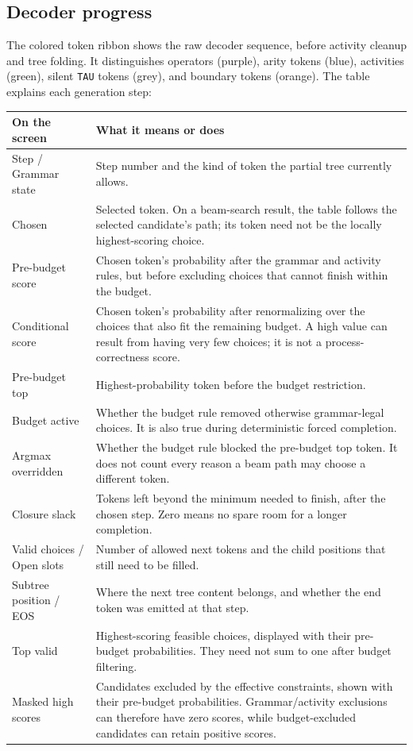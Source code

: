\documentclass[11pt,a4paper]{article}
\makeatletter
\newcommand{\code}[1]{\nolinkurl{#1}}
\newenvironment{controls}{%
  \small\begin{longtable}{@{}>{\raggedright\arraybackslash}p{.34\linewidth}
    >{\raggedright\arraybackslash}p{.62\linewidth}@{}}
  \toprule\textbf{On the screen} & \textbf{What it means or does}\\\midrule\endhead
  \bottomrule\endfoot
}{\end{longtable}\normalsize}
\makeatother
\begin{document}
\subsection{Decoder progress}
The colored token ribbon shows the raw decoder sequence, before activity
cleanup and tree folding. It distinguishes operators (purple), arity tokens
(blue), activities (green), silent \code{TAU} tokens (grey), and boundary
tokens (orange). The table explains each generation step:
\begin{controls}
Step / Grammar state & Step number and the kind of token the partial tree
currently allows.\\
Chosen & Selected token. On a beam-search result, the table follows the selected
candidate's path; its token need not be the locally highest-scoring choice.\\
Pre-budget score & Chosen token's probability after the grammar and activity
rules, but before excluding choices that cannot finish within the budget.\\
Conditional score & Chosen token's probability after renormalizing over the
choices that also fit the remaining budget. A high value can result from
having very few choices; it is not a process-correctness score.\\
Pre-budget top & Highest-probability token before the budget restriction.\\
Budget active & Whether the budget rule removed otherwise grammar-legal
choices. It is also true during deterministic forced completion.\\
Argmax overridden & Whether the budget rule blocked the pre-budget top token.
It does not count every reason a beam path may choose a different token.\\
Closure slack & Tokens left beyond the minimum needed to finish, after the
chosen step. Zero means no spare room for a longer completion.\\
Valid choices / Open slots & Number of allowed next tokens and the child
positions that still need to be filled.\\
Subtree position / EOS & Where the next tree content belongs, and whether
the end token was emitted at that step.\\
Top valid & Highest-scoring feasible choices, displayed with their pre-budget
probabilities. They need not sum to one after budget filtering.\\
Masked high scores & Candidates excluded by the effective constraints, shown
with their pre-budget probabilities. Grammar/activity exclusions can therefore
have zero scores, while budget-excluded candidates can retain positive scores.\\
\end{controls}
\end{document}
